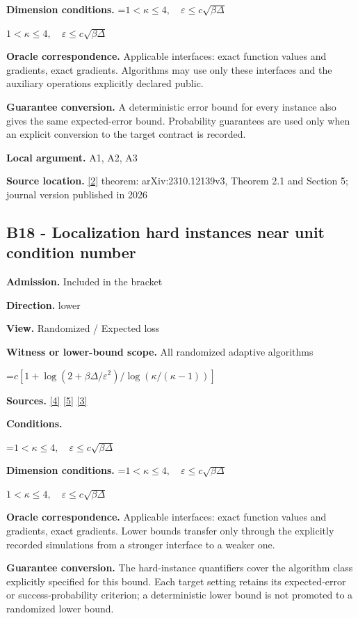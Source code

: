 \documentclass[10pt,a4paper]{article}
\newcommand{\AtlasMath}[1]{\par\begingroup\centering\setbox0=\hbox{$\displaystyle #1$}\ifdim\wd0>1.4\linewidth\typeout{ATLAS WIDE FORMULA: \the\wd0}\fi\ifdim\wd0>\linewidth\resizebox{\linewidth}{!}{\box0}\else\box0\fi\par\endgroup}
\newcommand{\AtlasInlineMath}[1]{\begingroup\setbox0=\hbox{$#1$}\ifdim\wd0>.4\linewidth\endgroup\AtlasMath{#1}\else\endgroup$#1$\fi}
\begin{document}
\textbf{Dimension conditions.} \AtlasInlineMath{1<\kappa\le4,\quad\varepsilon\le c\sqrt{\beta\Delta}}

\textbf{Oracle correspondence.} Applicable interfaces: exact function values and gradients, exact gradients. Algorithms may use only these interfaces and the auxiliary operations explicitly declared public.

\textbf{Guarantee conversion.} A deterministic error bound for every instance also gives the same expected-error bound. Probability guarantees are used only when an explicit conversion to the target contract is recorded.

\textbf{Local argument.} A1, A2, A3

\textbf{Source location.} \href{https://doi.org/10.1007/s10107-026-02352-2}{[2]} theorem: arXiv:2310.12139v3, Theorem 2.1 and Section 5; journal version published in 2026

\subsection{B18 - Localization hard instances near unit condition number}
\textbf{Admission.} Included in the bracket

\textbf{Direction.} lower

\textbf{View.} Randomized / Expected loss

\textbf{Witness or lower-bound scope.} All randomized adaptive algorithms

\AtlasMath{c[1+\log(2+\beta\Delta/\varepsilon^2)/\log(\kappa/(\kappa-1))]}
\textbf{Sources.} \href{https://arxiv.org/pdf/2101.09740v2}{[4]} \href{https://arxiv.org/pdf/2609.33360v2}{[5]} \href{https://arxiv.org/pdf/2609.10874}{[3]}

\textbf{Conditions.} 
\AtlasMath{1<\kappa\le4,\quad\varepsilon\le c\sqrt{\beta\Delta}}


\textbf{Dimension conditions.} \AtlasInlineMath{1<\kappa\le4,\quad\varepsilon\le c\sqrt{\beta\Delta}}

\textbf{Oracle correspondence.} Applicable interfaces: exact function values and gradients, exact gradients. Lower bounds transfer only through the explicitly recorded simulations from a stronger interface to a weaker one.

\textbf{Guarantee conversion.} The hard-instance quantifiers cover the algorithm class explicitly specified for this bound. Each target setting retains its expected-error or success-probability criterion; a deterministic lower bound is not promoted to a randomized lower bound.
\end{document}
